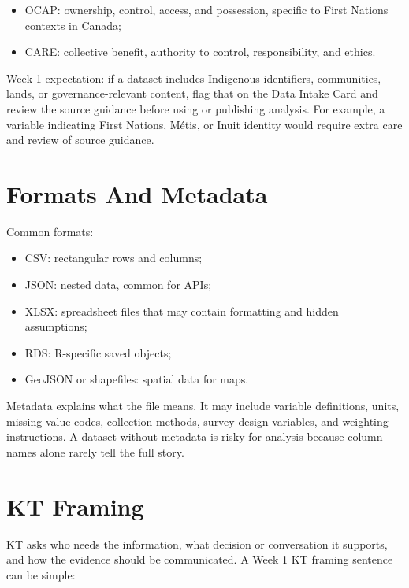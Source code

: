 \documentclass[
  letterpaper,
  DIV=11,
  numbers=noendperiod,
  oneside]{scrreprt}
\providecommand{\tightlist}{%
  \setlength{\itemsep}{0pt}\setlength{\parskip}{0pt}}
\begin{document}
\begin{itemize}
\tightlist
\item
  OCAP: ownership, control, access, and possession, specific to First
  Nations contexts in Canada;
\item
  CARE: collective benefit, authority to control, responsibility, and
  ethics.
\end{itemize}

Week 1 expectation: if a dataset includes Indigenous identifiers,
communities, lands, or governance-relevant content, flag that on the
Data Intake Card and review the source guidance before using or
publishing analysis. For example, a variable indicating First Nations,
Métis, or Inuit identity would require extra care and review of source
guidance.

\section*{Formats And Metadata}\label{formats-and-metadata}


Common formats:

\begin{itemize}
\tightlist
\item
  CSV: rectangular rows and columns;
\item
  JSON: nested data, common for APIs;
\item
  XLSX: spreadsheet files that may contain formatting and hidden
  assumptions;
\item
  RDS: R-specific saved objects;
\item
  GeoJSON or shapefiles: spatial data for maps.
\end{itemize}

Metadata explains what the file means. It may include variable
definitions, units, missing-value codes, collection methods, survey
design variables, and weighting instructions. A dataset without metadata
is risky for analysis because column names alone rarely tell the full
story.

\section*{KT Framing}\label{kt-framing}


KT asks who needs the information, what decision or conversation it
supports, and how the evidence should be communicated. A Week 1 KT
framing sentence can be simple:
\end{document}
